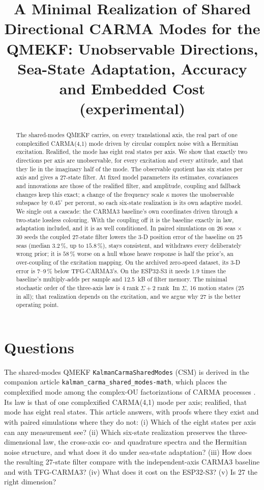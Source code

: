 \documentclass[conference]{IEEEtran}
\title{A Minimal Realization of Shared Directional CARMA Modes for the QMEKF:
Unobservable Directions, Sea-State Adaptation, Accuracy and Embedded Cost
(experimental)}
\author{%
  \IEEEauthorblockN{Mikhail S. Grushinskiy}
  \IEEEauthorblockA{Independent Researcher, USA, Fair Lawn\\
  Bareboat Necessities GitHub Project\\
  Email: mgrouch@users.github.com}%
}
\renewcommand{\Im}{\operatorname{Im}}
\theoremstyle{bodysmall}
\begin{document}
\maketitle

\begin{abstract}
The shared-modes QMEKF carries, on every translational axis, the real part
of one complexified CARMA(4,1) mode driven by circular complex noise with a
Hermitian excitation. Realified, the mode has eight real states per axis. We
show that exactly two directions per axis are unobservable, for every
excitation and every attitude, and that they lie in the imaginary half of the
mode. The observable quotient has six states per axis and gives a 27-state
filter. At fixed model parameters its estimates, covariances and innovations
are those of the realified filter, and amplitude, coupling and fallback
changes keep this exact; a change of the frequency scale $\kappa$ moves the
unobservable subspace by $0.45^\circ$ per percent, so each six-state
realization is its own adaptive model. We single out a cascade: the CARMA3
baseline's own coordinates driven through a two-state lossless colouring.
With the coupling off it is the baseline exactly in law, adaptation
included, and it is as well conditioned. In paired simulations on 26 seas
$\times$ 30 seeds the coupled 27-state filter lowers the 3-D position error
of the baseline on 25 seas (median $3.2\,\%$, up to $15.8\,\%$), stays
consistent, and withdraws every deliberately wrong prior; it is $58\,\%$
worse on a hull whose heave response is half the prior's, an over-coupling
of the excitation mapping. On the archived zero-speed dataset, its 3-D error is
7--9\,\% below TFG-CARMA3's. On the ESP32-S3 it needs 1.9 times the
baseline's multiply-adds per sample and \SI{12.5}{kB} of filter memory. The
minimal stochastic order of the three-axis law is
$4\operatorname{rank}\Sigma+2\operatorname{rank}\Im\Sigma$, 16 motion states
(25 in all); that realization depends on the excitation, and we argue why 27
is the better operating point.
\end{abstract}

\section{Questions}
The shared-modes QMEKF \texttt{KalmanCarmaSharedModes} (CSM) is derived in
the companion article \texttt{kalman\_carma\_shared\_modes-math}, which
places the complexified mode among the complex-OU factorizations of CARMA
processes \cite{fasen21}. Its law is that of one complexified CARMA(4,1)
mode per axis; realified, that mode has eight real states. This article
answers, with proofs where they exist and with paired simulations where they
do not:
(i) Which of the eight states per axis can any measurement see?
(ii) Which six-state realization preserves the three-dimensional law, the
cross-axis co- and quadrature spectra and the Hermitian noise structure, and
what does it do under sea-state adaptation?
(iii) How does the resulting 27-state filter compare with the
independent-axis CARMA3 baseline and with TFG-CARMA3?
(iv) What does it cost on the ESP32-S3?
(v) Is 27 the right dimension?
\end{document}

